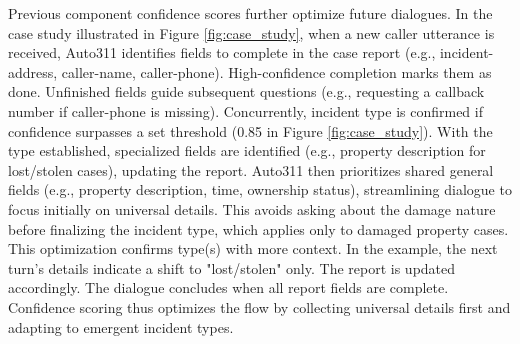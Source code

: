 Previous component confidence scores further optimize future dialogues. In the case study illustrated in Figure \ref{fig:case_study}, when a new caller utterance is received, Auto311 identifies fields to complete in the case report (e.g., incident-address, caller-name, caller-phone). High-confidence completion marks them as done. Unfinished fields guide subsequent questions (e.g., requesting a callback number if caller-phone is missing). Concurrently, incident type is confirmed if confidence surpasses a set threshold (0.85 in Figure \ref{fig:case_study}). With the type established, specialized fields are identified (e.g., property description for lost/stolen cases), updating the report. Auto311 then prioritizes shared general fields (e.g., property description, time, ownership status), streamlining dialogue to focus initially on universal details. This avoids asking about the damage nature before finalizing the incident type, which applies only to damaged property cases. This optimization confirms type(s) with more context. In the example, the next turn's details indicate a shift to "lost/stolen" only. The report is updated accordingly. The dialogue concludes when all report fields are complete. Confidence scoring thus optimizes the flow by collecting universal details first and adapting to emergent incident types.



